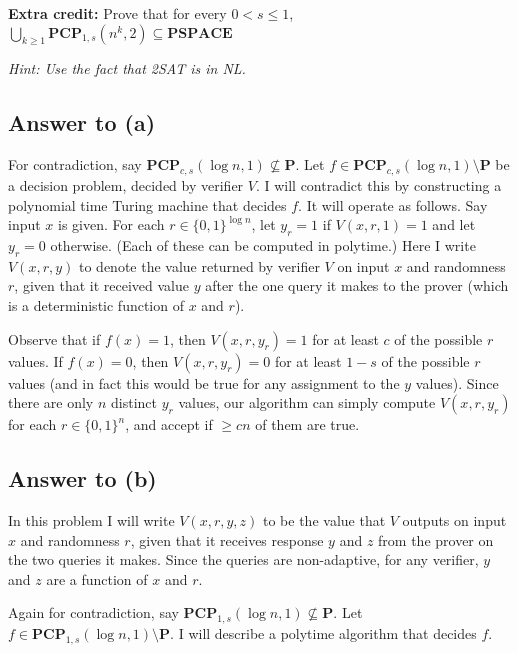 \documentclass{article}
\renewcommand{\P}{\mathbf{P}}
\newcommand{\mf}[1]{\mathbf{#1}}
\begin{document}
\smallskip

{\bf Extra credit:} Prove that for every $0<s\leq 1$, $\bigcup_{k \geq 1} \mf{PCP}_{1,s}(n^k,2) \subseteq \mf{PSPACE}$

\smallskip

\emph{Hint: Use the fact that 2SAT is in NL.} 

\newpage
\subsection*{Answer to (a)}
For contradiction, say $\mathbf{PCP}_{c, s}(\log n, 1) \not\subseteq \P$.
Let $f \in \mathbf{PCP}_{c, s}(\log n, 1) \setminus \P$ be a decision problem,
decided by verifier $V$.
I will contradict this by constructing a polynomial time Turing machine that decides $f$.
It will operate as follows.  Say input $x$ is given.
For each $r \in \{0, 1\}^{\log n}$, let $y_r = 1$ if $V(x, r, 1) = 1$ and let $y_r = 0$ otherwise. (Each of these can be computed in polytime.) Here I write $V(x, r, y)$ to denote the value returned by verifier $V$ on input $x$ and randomness $r$, given that it received value $y$ after the one query it makes to the prover (which is a deterministic function of $x$ and $r$).

Observe that if $f(x) = 1$, then $V(x, r, y_r) = 1$ for at least $c$ of the possible $r$ values.
If $f(x) = 0$, then $V(x, r, y_r) = 0$ for at least $1 - s$ of the possible $r$ values (and in fact this would be true for any assignment to the $y$ values).
Since there are only $n$ distinct $y_r$ values, our algorithm can simply compute $V(x, r, y_r)$ for each $r \in \{0, 1\}^n$, and accept if $\geq cn$ of them are true.

\subsection*{Answer to (b)}
In this problem I will write $V(x, r, y, z)$ to be the value that $V$ outputs on input $x$ and randomness $r$, given that it receives response $y$ and $z$ from the prover on the two queries it makes.  Since the queries are non-adaptive, for any verifier, $y$ and $z$ are a function of $x$ and $r$.

Again for contradiction, say $\mathbf{PCP}_{1, s}(\log n, 1) \not\subseteq \P$.
Let $f \in \mathbf{PCP}_{1, s}(\log n, 1) \setminus \P$.
I will describe a polytime algorithm that decides $f$.
\end{document}

